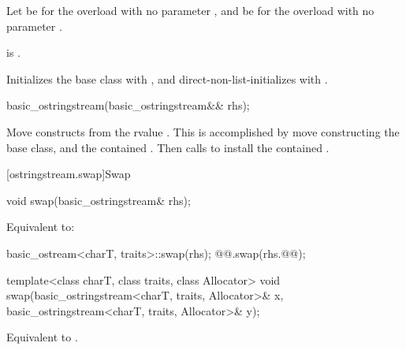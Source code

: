 \begin{itemdescr}
\pnum
Let  be 
for the overload with no parameter , and
 be  for the overload with no parameter .

\pnum
\constraints
{}
is .

\pnum
\effects
Initializes the base class with , and
direct-non-list-initializes  with .
\end{itemdescr}

%
\begin{itemdecl}
basic_ostringstream(basic_ostringstream&& rhs);
\end{itemdecl}

\begin{itemdescr}
\pnum
\effects
Move constructs from the rvalue . This
is accomplished by move constructing the base class, and the contained
.
Then calls 
to install the contained .
\end{itemdescr}

[ostringstream.swap]{Swap}

%
\begin{itemdecl}
void swap(basic_ostringstream& rhs);
\end{itemdecl}

\begin{itemdescr}
\pnum
\effects
Equivalent to:
\begin{codeblock}
basic_ostream<charT, traits>::swap(rhs);
@@.swap(rhs.@@);
\end{codeblock}
\end{itemdescr}

%
\begin{itemdecl}
template<class charT, class traits, class Allocator>
  void swap(basic_ostringstream<charT, traits, Allocator>& x,
            basic_ostringstream<charT, traits, Allocator>& y);
\end{itemdecl}

\begin{itemdescr}
\pnum
\effects
Equivalent to .
\end{itemdescr}

